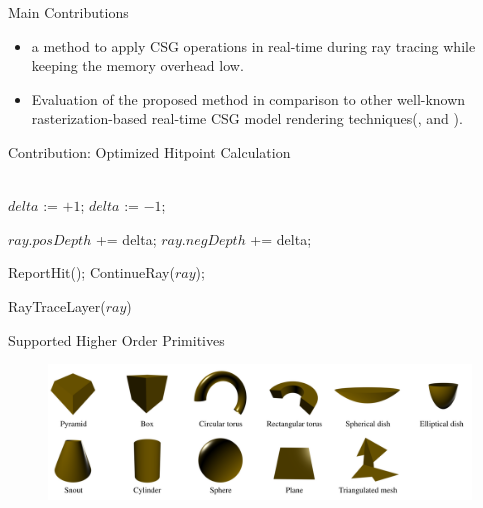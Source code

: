 \documentclass{beamer}
\newcommand{\BLUECOMMENT}[1]{\color{blue}{#1}\color{black}}
\begin{document}
\begin{frame}{Main Contributions}
	\begin{itemize}
		\item a method to apply CSG operations in real-time during ray tracing while keeping the memory overhead low.
		\item Evaluation of the proposed method in comparison to other well-known rasterization-based real-time CSG model rendering techniques(\cite{goldfeather:86:FCSGDPPGS}, and \cite{Stewart02linear-timecsg}).
	\end{itemize}
\end{frame}

\begin{frame}{Contribution: Optimized Hitpoint Calculation}
	\begin{algorithm}[H]
		\BLUECOMMENT {$ray$: current ray hitting a primitive}\\
		\vspace{0.5mm}
			{ $delta$ := $+1$; }
			{ $delta$ := $-1$; }

			{ $ray.posDepth$ += delta;  }
			{ $ray.negDepth$ += delta;  }

			{ ReportHit(); \BLUECOMMENT{ // final hit in layer found } }
			{ ContinueRay($ray$); \BLUECOMMENT{ // still inside a negative medium } }		
		\caption{RayTraceLayer($ray$)}
		\label{alg:ray-trace-layer}
	\end{algorithm}
\end{frame}

\begin{frame}{Supported Higher Order Primitives}
	
	\begin{figure}[ht!]
		\centering
		\includegraphics[width=0.9\linewidth]{figures/hops.png}
	\end{figure}
\end{frame}
\end{document}
